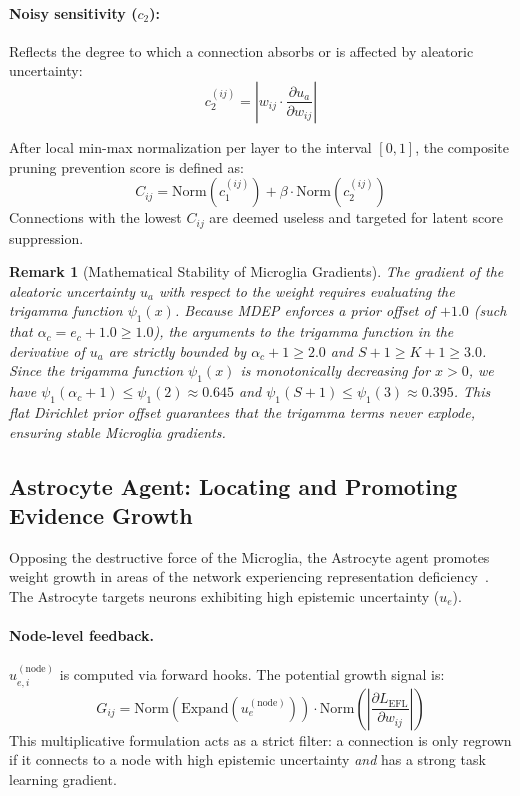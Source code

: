 \documentclass[11pt, a4paper]{article}
\newtheorem{remark}{Remark}
\begin{document}
\paragraph{Noisy sensitivity ($c_2$):}
Reflects the degree to which a connection absorbs or is affected by aleatoric uncertainty:
\begin{equation}
    c_2^{(ij)} = \left| w_{ij} \cdot \frac{\partial u_a}{\partial w_{ij}} \right|
\end{equation}

After local min-max normalization per layer to the interval $[0, 1]$, the composite pruning prevention score is defined as:
\begin{equation}\label{eq:C_ij}
    C_{ij} = \text{Norm}(c_1^{(ij)}) + \beta \cdot \text{Norm}(c_2^{(ij)})
\end{equation}
Connections with the lowest $C_{ij}$ are deemed useless and targeted for latent score suppression.

\begin{remark}[Mathematical Stability of Microglia Gradients]
The gradient of the aleatoric uncertainty $u_a$ with respect to the weight requires evaluating the trigamma function $\psi_1(x)$. Because MDEP enforces a prior offset of $+1.0$ (such that $\alpha_c = e_c + 1.0 \ge 1.0$), the arguments to the trigamma function in the derivative of $u_a$ are strictly bounded by $\alpha_c + 1 \ge 2.0$ and $S + 1 \ge K + 1 \ge 3.0$. Since the trigamma function $\psi_1(x)$ is monotonically decreasing for $x > 0$, we have $\psi_1(\alpha_c+1) \le \psi_1(2) \approx 0.645$ and $\psi_1(S+1) \le \psi_1(3) \approx 0.395$. This flat Dirichlet prior offset guarantees that the trigamma terms never explode, ensuring stable Microglia gradients.
\end{remark}

\subsection{Astrocyte Agent: Locating and Promoting Evidence Growth}\label{subsec:astrocyte}

Opposing the destructive force of the Microglia, the Astrocyte agent promotes weight growth in areas of the network experiencing representation deficiency~\cite{chung2013astrocytes, vainchtein2018astrocyte}. The Astrocyte targets neurons exhibiting high epistemic uncertainty ($u_e$).

\paragraph{Node-level feedback.}
$u_{e,i}^{(\text{node})}$ is computed via forward hooks. The potential growth signal is:
\begin{equation}\label{eq:G_ij}
    G_{ij} = \text{Norm}\!\left(\text{Expand}(u_e^{(\text{node})})\right) \cdot \text{Norm}\!\left(\left|\frac{\partial L_{\text{EFL}}}{\partial w_{ij}}\right|\right)
\end{equation}
This multiplicative formulation acts as a strict filter: a connection is only regrown if it connects to a node with high epistemic uncertainty \emph{and} has a strong task learning gradient.
\end{document}
